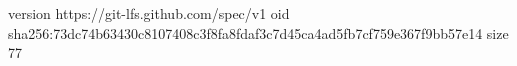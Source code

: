version https://git-lfs.github.com/spec/v1
oid sha256:73dc74b63430c8107408c3f8fa8fdaf3c7d45ca4ad5fb7cf759e367f9bb57e14
size 77
